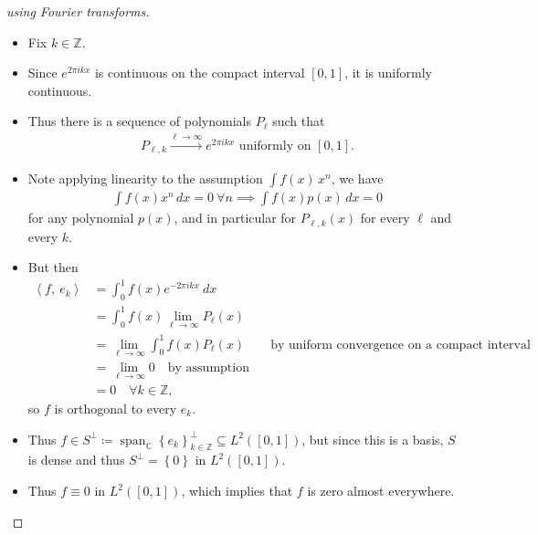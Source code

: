 \begin{solution}

\envlist

\begin{proof}[using Fourier transforms]

\envlist

\begin{itemize}
\item
  Fix \(k \in {\mathbb{Z}}\).
\item
  Since \(e^{2\pi i k x}\) is continuous on the compact interval
  \([0, 1]\), it is uniformly continuous.
\item
  Thus there is a sequence of polynomials \(P_\ell\) such that
  \begin{align*}
  P_{\ell, k} \overset{\ell\to\infty}\longrightarrow e^{2\pi i k x} \text{ uniformly on } [0,1]
  .\end{align*}
\item
  Note applying linearity to the assumption \(\int f(x) \, x^n\), we
  have
  \begin{align*}
  \int f(x) x^n \,dx = 0 ~\forall n \implies \int f(x) p(x) \,dx = 0 
  \end{align*}
  for any polynomial \(p(x)\), and in particular for \(P_{\ell, k}(x)\)
  for every \(\ell\) and every \(k\).
\item
  But then\\
  \begin{align*}
  {\left\langle {f},~{e_k} \right\rangle} 
  &= \int_0^1 f(x) e^{-2\pi i k x} ~dx \\
  &= \int_0^1 f(x) \lim_{\ell \to \infty} P_\ell(x) \\
  &= \lim_{\ell \to \infty}  \int_0^1 f(x) P_\ell(x) \quad\quad \text{by uniform convergence on a compact interval} \\
  &= \lim_{\ell \to \infty} 0 \quad\text{by assumption}\\
  &= 0 \quad \forall k\in {\mathbb{Z}}
  ,\end{align*}
  so \(f\) is orthogonal to every \(e_k\).
\item
  Thus
  \(f\in S^\perp \coloneqq{\operatorname{span}}_{\mathbb{C}}\left\{{e_k}\right\}_{k\in {\mathbb{Z}}}^\perp \subseteq L^2([0, 1])\),
  but since this is a basis, \(S\) is dense and thus
  \(S^\perp = \left\{{0}\right\}\) in \(L^2([0, 1])\).
\item
  Thus \(f\equiv 0\) in \(L^2([0, 1])\), which implies that \(f\) is
  zero almost everywhere.
\end{itemize}


\end{proof}
\end{solution}
